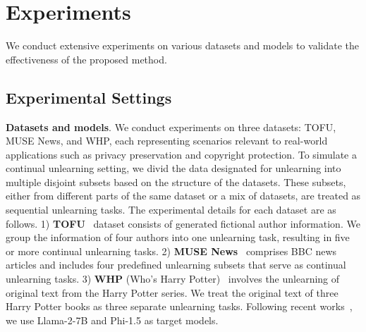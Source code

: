 \documentclass{article}
\theoremstyle{plain}
\theoremstyle{definition}
\theoremstyle{remark}
\begin{document}
\section{Experiments}
We conduct extensive experiments on various datasets and models to validate the effectiveness of the proposed method.
\subsection{Experimental Settings}
\textbf{Datasets and models}. 
We conduct experiments on three datasets: TOFU, MUSE News, and WHP, each representing scenarios relevant to real-world applications such as privacy preservation and copyright protection.
To simulate a continual unlearning setting, we divid the data designated for unlearning into multiple disjoint subsets based on the structure of the datasets.
These subsets, either from different parts of the same dataset or a mix of datasets, are treated as sequential unlearning tasks.
The experimental details for each dataset are as follows.
1) \textbf{TOFU}~\cite{DBLP:journals/corr/abs-2401-06121} dataset consists of generated fictional author information. We group the information of four authors into one unlearning task, resulting in five or more continual unlearning tasks.
2) \textbf{MUSE News}~\cite{DBLP:journals/corr/abs-2407-06460} comprises BBC news articles and includes four predefined unlearning subsets that serve as continual unlearning tasks.
3) \textbf{WHP} (Who's Harry Potter)~\cite{DBLP:journals/corr/abs-2310-02238,DBLP:journals/corr/abs-2407-06460} involves the unlearning of original text from the Harry Potter series. We treat the original text of three Harry Potter books as three separate unlearning tasks.
Following recent works~\cite{DBLP:journals/corr/abs-2401-06121, DBLP:journals/corr/abs-2410-17509}, we use Llama-2-7B and Phi-1.5 as target models.
\end{document}
